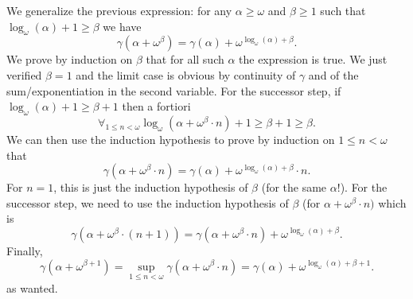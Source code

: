 We generalize the previous expression: for any \(\alpha \geq \omega\)
and \(\beta \geq 1\) such that \(\log_\omega⁡(\alpha) + 1 \geq \beta\)
we have
\begin{equation*}
\gamma(\alpha+\omega^{\beta})=\gamma(\alpha)+\omega^{\log_{\omega}(\alpha)+\beta}.
\end{equation*}
We prove by induction on \(\beta\)
that for all such \(\alpha\) the expression is true. We just
verified \(\beta =1\) and the limit case is obvious by continuity
of \(\gamma\) and of the sum/exponentiation in the second variable. For
the successor step, if \(\log_\omega⁡(\alpha) + 1 \geq \beta + 1\) then a
fortiori
\begin{equation*}
\forall_{1\leq n<\omega} \log_\omega⁡(\alpha + \omega^\beta \cdot n) + 1
  \geq \beta + 1 \geq \beta.
\end{equation*}
We can then use the induction hypothesis
to prove by induction on \(1\leq n<\omega\) that
\begin{equation*}
\gamma(\alpha+{\omega^{\beta}\cdot n})
  = \gamma(\alpha)+\omega^{\log_{\omega}(\alpha)+\beta}\cdot n.
\end{equation*}
For \(n=1\), this is just the induction hypothesis
of \(\beta\) (for the same \(\alpha\)!). For the successor step, we need to
use the induction hypothesis of \(\beta\)
(for \(\alpha + \omega^\beta \cdot n)\)
which is
\begin{equation*}
\gamma(\alpha+{\omega^{\beta}\cdot{(n+1)}})
  = \gamma(\alpha+{\omega^{\beta} \cdot n})
     + \omega^{\log_{\omega}(\alpha)+\beta}.
\end{equation*}
Finally,
\begin{equation*}
\gamma(\alpha + \omega^{\beta+1})
  = {\sup_{1\leq n< \omega}{\gamma(\alpha+{\omega^{\beta}\cdot n})}}
  = \gamma(\alpha)+\omega^{\log_{\omega}(\alpha)+\beta+1}.
\end{equation*}
as wanted.

